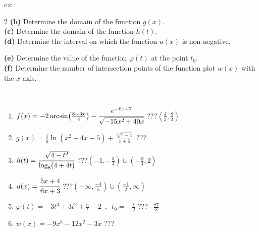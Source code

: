 \documentclass[10pt]{report}
\begin{document}
\begin{tabular}{c:c}
\begin{minipage}[c][104.5mm][t]{0.5\linewidth}
\begin{center}
\begin{minipage}{0.95\linewidth}
\begin{center}
{\begin{multicols}{2}
\textbf{(b)} Determine the domain of the function \(g(x)\). \\[1mm]
\textbf{(c)} Determine the domain of the function \(h(t)\). \\[1mm]
\textbf{(d)} Determine the interval on which the function \(u(x)\) is non-negative. \par \columnbreak
\textbf{(e)} Determine the value of the function \(\varphi(t)\) at the point \(t_0\). \\[1mm]
\textbf{(f)} Determine the number of intersection points of the function plot \(w(x)\) with the \(x\)-axis. \\[1mm]
\end{multicols}
}
\end{center}
\end{minipage}
\\[4mm]
\begin{minipage}{0.79\linewidth}
\begin{center}
\begin{varwidth}{\linewidth}
\begin{enumerate}
\small
\item $f(x) = -2\arcsin\!\left( \frac{8-3x}{4} \right) - \cfrac{e^{-6x+7}}{\sqrt{-15x^2+40x}}$\quad \dotfill\; ???\;\dotfill \quad $\left\langle\frac{4}{3} , \frac{8}{3}\right)$
\item $g(x) = \frac{1}{6} \ln{\!(x^2+4x-5)}+\frac{\sqrt[3]{7-x}}{x+6}$\quad \dotfill\; ???\;\dotfill {}
\item $h(t) = \cfrac{\sqrt{4-t^2}}{\log_8(4+4t)}$\quad \dotfill\; ???\;\dotfill \quad $\left(-1 , -\frac{3}{4}\right)\cup\left(-\frac{3}{4} , 2\right\rangle$
\item $u(x) = \cfrac{5x+4}{6x+3}$\quad \dotfill\; ???\;\dotfill \quad $\left(-\infty , \frac{-4}{5}\right)\cup\left(\frac{-1}{2} , \infty\right)$
\item $\varphi(t) = -3t^3+3t^2+\frac{5}{t}-2 \enspace , \enspace t_0=-\frac{1}{2}$\quad \dotfill\; ???\;\dotfill \quad $-\frac{87}{8}$
\item $w(x) = -9x^3-12x^2-3x$\quad \dotfill\; ???\;\dotfill {}
\end{enumerate}
\end{varwidth}
\end{center}
\end{minipage}
\begin{minipage}{0.20\linewidth}
\begin{center}

\end{center}
\end{minipage}
\end{center}
\end{minipage}
\end{tabular}
\end{document}
